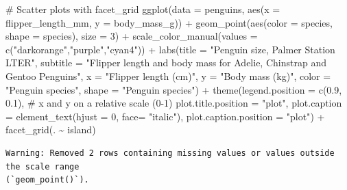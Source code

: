 \documentclass[
  letterpaper,
  DIV=11,
  numbers=noendperiod]{scrreprt}
\newenvironment{Shaded}{\begin{snugshade}}{\end{snugshade}}
\newcommand{\AttributeTok}[1]{\textcolor[rgb]{0.40,0.45,0.13}{#1}}
\newcommand{\CommentTok}[1]{\textcolor[rgb]{0.37,0.37,0.37}{#1}}
\newcommand{\DecValTok}[1]{\textcolor[rgb]{0.68,0.00,0.00}{#1}}
\newcommand{\FloatTok}[1]{\textcolor[rgb]{0.68,0.00,0.00}{#1}}
\newcommand{\FunctionTok}[1]{\textcolor[rgb]{0.28,0.35,0.67}{#1}}
\newcommand{\NormalTok}[1]{\textcolor[rgb]{0.00,0.23,0.31}{#1}}
\newcommand{\SpecialCharTok}[1]{\textcolor[rgb]{0.37,0.37,0.37}{#1}}
\newcommand{\StringTok}[1]{\textcolor[rgb]{0.13,0.47,0.30}{#1}}
\begin{document}
\begin{Shaded}
\begin{Highlighting}[]
\CommentTok{\# Scatter plots with facet\_grid}
\FunctionTok{ggplot}\NormalTok{(}\AttributeTok{data =}\NormalTok{ penguins, }\FunctionTok{aes}\NormalTok{(}\AttributeTok{x =}\NormalTok{ flipper\_length\_mm, }\AttributeTok{y =}\NormalTok{ body\_mass\_g)) }\SpecialCharTok{+}
  \FunctionTok{geom\_point}\NormalTok{(}\FunctionTok{aes}\NormalTok{(}\AttributeTok{color =}\NormalTok{ species, }\AttributeTok{shape =}\NormalTok{ species), }\AttributeTok{size =} \DecValTok{3}\NormalTok{) }\SpecialCharTok{+}
  \FunctionTok{scale\_color\_manual}\NormalTok{(}\AttributeTok{values =} \FunctionTok{c}\NormalTok{(}\StringTok{"darkorange"}\NormalTok{,}\StringTok{"purple"}\NormalTok{,}\StringTok{"cyan4"}\NormalTok{)) }\SpecialCharTok{+}
  \FunctionTok{labs}\NormalTok{(}\AttributeTok{title =} \StringTok{"Penguin size, Palmer Station LTER"}\NormalTok{,}
       \AttributeTok{subtitle =} \StringTok{"Flipper length and body mass for Adelie, Chinstrap and Gentoo Penguins"}\NormalTok{,}
       \AttributeTok{x =} \StringTok{"Flipper length (cm)"}\NormalTok{,}
       \AttributeTok{y =} \StringTok{"Body mass (kg)"}\NormalTok{,}
       \AttributeTok{color =} \StringTok{"Penguin species"}\NormalTok{,}
       \AttributeTok{shape =} \StringTok{"Penguin species"}\NormalTok{) }\SpecialCharTok{+}
  \FunctionTok{theme}\NormalTok{(}\AttributeTok{legend.position =} \FunctionTok{c}\NormalTok{(}\FloatTok{0.9}\NormalTok{, }\FloatTok{0.1}\NormalTok{), }\CommentTok{\# x and y on a relative scale (0{-}1)}
        \AttributeTok{plot.title.position =} \StringTok{"plot"}\NormalTok{,}
        \AttributeTok{plot.caption =} \FunctionTok{element\_text}\NormalTok{(}\AttributeTok{hjust =} \DecValTok{0}\NormalTok{, }\AttributeTok{face=} \StringTok{"italic"}\NormalTok{),}
        \AttributeTok{plot.caption.position =} \StringTok{"plot"}\NormalTok{) }\SpecialCharTok{+}
  \FunctionTok{facet\_grid}\NormalTok{(. }\SpecialCharTok{\textasciitilde{}}\NormalTok{ island) }
\end{Highlighting}
\end{Shaded}

\begin{verbatim}
Warning: Removed 2 rows containing missing values or values outside the scale range
(`geom_point()`).
\end{verbatim}
\end{document}
